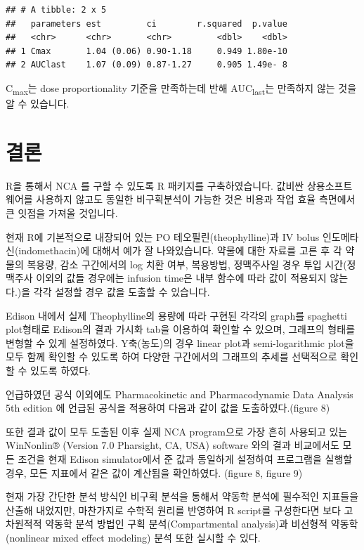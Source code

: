 \documentclass[12pt,]{krantz}
\begin{document}
\begin{verbatim}
## # A tibble: 2 x 5
##   parameters est         ci        r.squared  p.value
##   <chr>      <chr>       <chr>         <dbl>    <dbl>
## 1 Cmax       1.04 (0.06) 0.90-1.18     0.949 1.80e-10
## 2 AUClast    1.07 (0.09) 0.87-1.27     0.905 1.49e- 8
\end{verbatim}

C\textsubscript{max}는 dose proportionality 기준을 만족하는데 반해 AUC\textsubscript{last}는 만족하지 않는 것을 알 수 있습니다.

\hypertarget{conclusion}{%
\chapter{결론}\label{conclusion}}

R을 통해서 NCA 를 구할 수 있도록 R 패키지를 구축하였습니다. 값비싼 상용소프트웨어를 사용하지 않고도 동일한 비구획분석이 가능한 것은 비용과 작업 효율 측면에서 큰 잇점을 가져올 것입니다.

현재 R에 기본적으로 내장되어 있는 PO 테오필린(theophylline)과 IV bolus 인도메타신(indomethacin)에 대해서 예가 잘 나와있습니다.
약물에 대한 자료를 고른 후 각 약물의 복용량, 감소 구간에서의 log 치환 여부, 복용방법, 정맥주사일 경우 투입 시간(정맥주사 이외의 값들 경우에는 infusion time은 내부 함수에 따라 값이 적용되지 않는다.)을 각각 설정할 경우 값을 도출할 수 있습니다.

Edison 내에서 실제 Theophylline의 용량에 따라 구현된 각각의 graph를 spaghetti plot형태로 Edison의 결과 가시화 tab을 이용하여 확인할 수 있으며, 그래프의 형태를 변형할 수 있게 설정하였다.
Y축(농도)의 경우 linear plot과 semi-logarithmic plot을 모두 함께 확인할 수 있도록 하여 다양한 구간에서의 그래프의 추세를 선택적으로 확인할 수 있도록 하였다.

언급하였던 공식 이외에도 Pharmacokinetic and Pharmacodynamic Data Analysis 5th edition 에 언급된 공식을 적용하여 다음과 같이 값을 도출하였다.(figure 8)

또한 결과 값이 모두 도출된 이후 실제 NCA program으로 가장 흔히 사용되고 있는 WinNonlin® (Version 7.0 Pharsight, CA, USA) software 와의 결과 비교에서도 모든 조건을 현재 Edison simulator에서 준 값과 동일하게 설정하여 프로그램을 실행할 경우, 모든 지표에서 같은 값이 계산됨을 확인하였다. (figure 8, figure 9)

현재 가장 간단한 분석 방식인 비구획 분석을 통해서 약동학 분석에 필수적인 지표들을 산출해 내었지만, 마찬가지로 수학적 원리를 반영하여 R script를 구성한다면 보다 고차원적적 약동학 분석 방법인 구획 분석(Compartmental analysis)과 비선형적 약동학(nonlinear mixed effect modeling) 분석 또한 실시할 수 있다.
\end{document}
